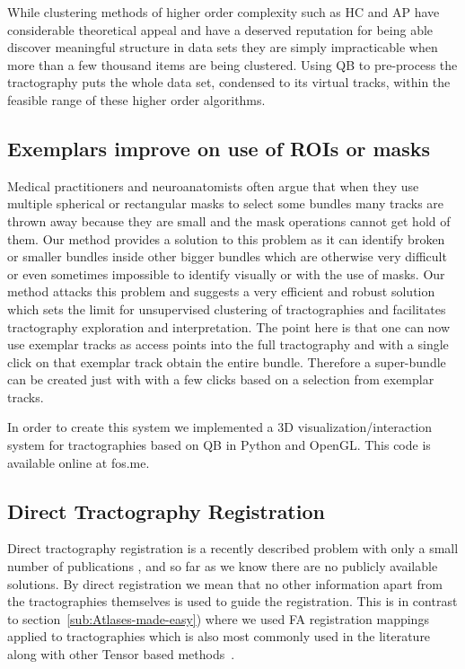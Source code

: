 \documentclass[journal]{IEEEtran}
\begin{document}
While clustering methods of higher order complexity such as HC and AP
have considerable theoretical appeal and have a deserved reputation for
being able discover meaningful structure in data sets they are simply
impracticable when more than a few thousand items are being
clustered. Using QB to pre-process the tractography puts the whole data
set, condensed to its virtual tracks, within the feasible range of these
higher order algorithms.

\subsection{Exemplars improve on use of ROIs or masks}

Medical practitioners and neuroanatomists often argue that when they use
multiple spherical or rectangular masks to select some bundles many
tracks are thrown away because they are small and the mask operations
cannot get hold of them. Our method provides a solution to this problem
as it can identify broken or smaller bundles inside other bigger bundles
which are otherwise very difficult or even sometimes impossible to
identify visually or with the use of masks. Our method attacks this
problem and suggests a very efficient and robust solution which sets the
limit for unsupervised clustering of tractographies and facilitates
tractography exploration and interpretation. The point here is that one
can now use exemplar tracks as access points into the full tractography
and with a single click on that exemplar track obtain the entire bundle.
Therefore a super-bundle can be created just with with a few clicks
based on a selection from exemplar tracks.

In order to create this system we implemented a 3D
visualization/interaction system for tractographies based on QB in
Python and OpenGL. This code is available online at fos.me.


\subsection{Direct Tractography Registration}

Direct tractography registration is a recently described problem with
only a small number of publications \cite{leemans2006multiscale,
  mayer2008bundles, mayerdirect, mayer2011supervised,
  durrleman2010registration, zvitia2008adaptive, Zvitia2010,
  ZiyanMICCAI07}, and so far as we know there are no publicly available
solutions. By direct registration we mean that no other information
apart from the tractographies themselves is used to guide the
registration. This is in contrast to
section~\ref{sub:Atlases-made-easy}) where we used FA registration
mappings applied to tractographies which is also most commonly used in
the literature along with other Tensor based
methods~\cite{goh2006algebraic}.
\end{document}
